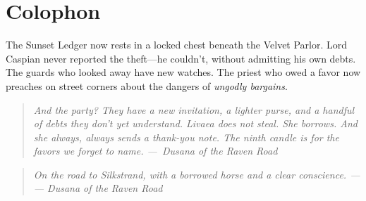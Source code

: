 \documentclass[12pt]{book}
\newcommand{\dusana}[1]{%
    \begin{quote}\itshape #1 ---~Dusana of the Raven Road\end{quote}}
\newcommand{\letter}[2]{%
    \begin{quote}\small\itshape #1 \hfill --- #2\end{quote}}
\begin{document}
\chapter{Colophon}

The Sunset Ledger now rests in a locked chest beneath the Velvet Parlor. Lord Caspian never reported the theft---he couldn't, without admitting his own debts. The guards who looked away have new watches. The priest who owed a favor now preaches on street corners about the dangers of \textit{ungodly bargains}.

\vspace{1em}
\dusana{And the party? They have a new invitation, a lighter purse, and a handful of debts they don't yet understand. Livaea does not steal. She borrows. And she always, always sends a thank-you note. The ninth candle is for the favors we forget to name.}

\vspace{1em}
\letter{On the road to Silkstrand, with a borrowed horse and a clear conscience.}{--- Dusana of the Raven Road}
\end{document}
